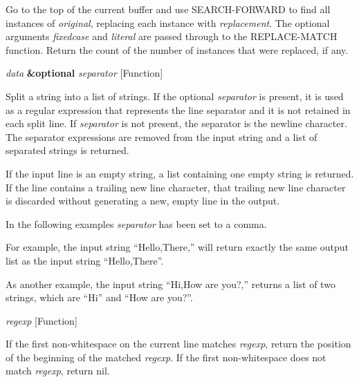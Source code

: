 \begin{doc-string}
Go to the top of the current buffer and use SEARCH-FORWARD to find all
instances of \emph{original}, replacing each instance with \emph{replacement}.  The optional
arguments \emph{fixedcase} and \emph{literal} are passed through to the REPLACE-MATCH
function.  Return the count of the number of instances that were replaced,
if any.
\end{doc-string}

\vspace{1em}
\noindent
{}
\usebox{\funcname}\emph{data} \textbf{\&optional} \emph{separator}
 \hfill [Function]

\begin{doc-string}
Split a string into a list of strings.  If the optional \emph{separator} is present,
it is used as a regular expression that represents the line separator and it is
not retained in each split line.  If \emph{separator} is not present, the separator is
the newline character.  The separator expressions are removed from the
input string and a list of separated strings is returned.

If the input line is an empty string, a list containing one empty string is
returned.  If the line contains a trailing new line character, that trailing new
line character is discarded without generating a new, empty line in the output.

In the following examples \emph{separator} has been set to a comma.

For example, the input string ``Hello,There,'' will return exactly the same
output list as the input string ``Hello,There''.

As another example, the input string ``Hi,How are you?,'' returns a list of
two strings, which are ``Hi'' and ``How are you?''.
\end{doc-string}

\vspace{1em}
\noindent
{}
\usebox{\funcname}\emph{regexp}
 \hfill [Function]

\begin{doc-string}
If the first non-whitespace on the current line matches \emph{regexp}, return the position
of the beginning of the matched \emph{regexp}.  If the first non-whitespace does not match
\emph{regexp}, return nil.
\end{doc-string}

